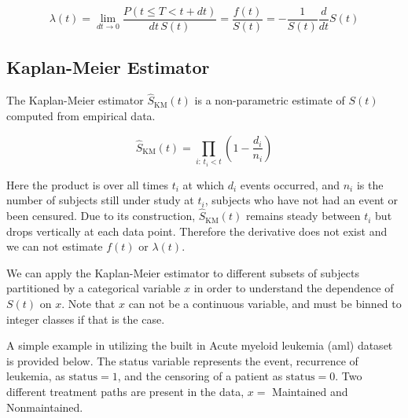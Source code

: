 \begin{equation}\label{eq:Survival:hazard}
\lambda\left(t\right) = \lim_{dt \to 0} \frac{P\left(t \leq T < t + dt\right)}{dt \, S\left(t\right)} = \frac{f\left(t\right)}{S\left(t\right)} = -\frac{1}{S\left(t\right)} \frac{d}{dt}S\left(t\right)
\end{equation}

\subsection{Kaplan-Meier Estimator}
\label{additional:Survival:KM}

The Kaplan-Meier estimator $\hat{S}_{\text{KM}}\left(t\right)$ is a non-parametric estimate of $S\left(t\right)$ computed from empirical data.

\begin{equation}\label{eq:Survival:KM}
\hat{S}_{\text{KM}}\left(t\right) = \prod_{i:\,t_{i} < t} \left(1 - \frac{d_{i}}{n_{i}}\right)
\end{equation}

\noindent Here the product is over all times $t_{i}$ at which $d_{i}$ events occurred,
and $n_{i}$ is the number of subjects still under study at $t_{i}$,
\ie subjects who have not had an event or been censured.
Due to its construction, $\hat{S}_{\text{KM}}\left(t\right)$ remains steady
between $t_{i}$ but drops vertically at each data point.
Therefore the derivative does not exist and we can not estimate $f\left(t\right)$ or $\lambda\left(t\right)$.


We can apply the Kaplan-Meier estimator to different subsets of subjects partitioned by a categorical variable $x$
in order to understand the dependence of $S\left(t\right)$ on $x$.
Note that $x$ can not be a continuous variable, and must be binned to integer classes if that is the case.

A simple example in \R utilizing the built in Acute myeloid leukemia (aml) dataset is provided below.
The status variable represents the event, recurrence of leukemia, as $\text{status}=1$, and the censoring of a patient as $\text{status}=0$.
Two different treatment paths are present in the data, $x=$ Maintained and Nonmaintained.

